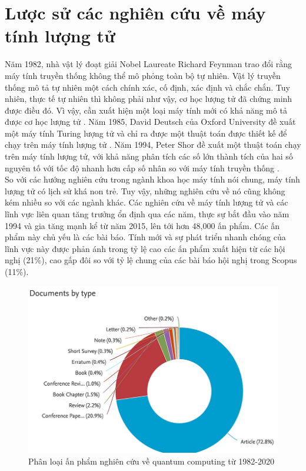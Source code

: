 \section{Lược sử các nghiên cứu về máy tính lượng tử}
Năm 1982, nhà vật lý đoạt giải Nobel Laureate Richard Feynman trao đổi rằng máy tính truyền thống không thể mô phỏng toàn bộ tự nhiên. Vật lý truyền thống mô tả tự nhiên một cách chính xác, cố định, xác định và chắc chắn. Tuy nhiên, thực tế tự nhiên thì không phải như vậy, cơ học lượng tử đã chứng minh được điều đó. Vì vậy, cần xuất hiện một loại máy tính mới có khả năng mô tả được cơ học lượng tử \cite{feynman2018simulating}. Năm 1985, David Deutsch của Oxford University đề xuất một máy tính Turing lượng tử và chỉ ra được một thuật toán được thiết kế để chạy trên máy tính lượng tử \cite{deutsch1985quantum}. Năm 1994, Peter Shor đề xuất một thuật toán chạy trên máy tính lượng tử, với khả năng phân tích các số lớn thành tích của hai số nguyên tố với tốc độ nhanh hơn cấp số nhân so với máy tính truyền thống \cite{shor1994algorithms}. \\
\indent
So với các hướng nghiên cứu trong ngành khoa học máy tính nói chung, máy tính lượng tử có lịch sử khá non trẻ. Tuy vậy, những nghiên cứu về nó cũng không kém nhiều so với các ngành khác. Các nghiên cứu về máy tính lượng tử và các lĩnh vực liên quan tăng trưởng ổn định qua các năm, thực sự bắt đầu vào năm 1994 và gia tăng mạnh kể từ năm 2015, lên tới hơn 48,000 ấn phẩm. Các ấn phẩm này chủ yếu là các bài báo. Tính mới và sự phát triển nhanh chóng của lĩnh vực này được phản ánh trong tỷ lệ cao các ấn phẩm xuất hiện từ các hội nghị (21\%), cao gấp đôi so với tỷ lệ chung của các bài báo hội nghị trong Scopus (11\%)\cite{elsevie2021quantum}.
\begin{figure}
    \centering
    \includegraphics[scale=0.5]{graphics/chapter-1/chapter1-document-by-type.jpg}
    \caption{Phân loại ấn phẩm nghiên cứu về quantum computing từ 1982-2020 \cite{elsevie2021quantum}}
    \label{fig:my_label}
\end{figure} \\
